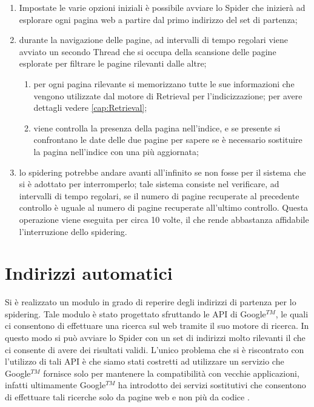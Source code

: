 \begin{enumerate}
\item Impostate le varie opzioni iniziali è possibile avviare lo Spider che inizierà ad esplorare ogni pagina web a partire dal primo indirizzo del set di partenza;
\item durante la navigazione delle pagine, ad intervalli di tempo regolari viene avviato un secondo Thread che si occupa della scansione delle pagine esplorate per filtrare le pagine rilevanti dalle altre;
	\begin{enumerate}
	\item per ogni pagina rilevante si memorizzano tutte le sue informazioni che vengono utilizzate dal motore di Retrieval per l'indicizzazione; per avere dettagli vedere \ref{cap:Retrieval};
	\item viene controlla la presenza della pagina nell'indice, e se presente si confrontano le date delle due pagine per sapere se è necessario sostituire la pagina nell'indice con una più aggiornata;
	\end{enumerate}
\item lo spidering potrebbe andare avanti all'infinito se non fosse per il sistema che si è adottato per interromperlo; tale sistema consiste nel verificare, ad intervalli di tempo regolari, se il numero di pagine recuperate al precedente controllo è uguale al numero di pagine recuperate all'ultimo controllo. Questa operazione viene eseguita per circa 10 volte, il che rende abbastanza affidabile l'interruzione dello spidering.
\end{enumerate}
\section{Indirizzi automatici}\label{cap:spider:roots}
Si è realizzato un modulo in grado di reperire degli indirizzi di partenza per lo spidering. Tale modulo è stato progettato sfruttando le API di Google$^{TM}$, le quali ci consentono di effettuare una ricerca sul web tramite il suo motore di ricerca. In questo modo si può avviare lo Spider con un set di indirizzi molto rilevanti il che ci consente di avere dei risultati validi. L'unico problema che si è riscontrato con l'utilizzo di tali API è che siamo stati costretti ad utilizzare un servizio che Google$^{TM}$ fornisce solo per mantenere la compatibilità con vecchie applicazioni, infatti ultimamente Google$^{TM}$ ha introdotto dei servizi sostitutivi che consentono di effettuare tali ricerche solo da pagine web e non più da codice .